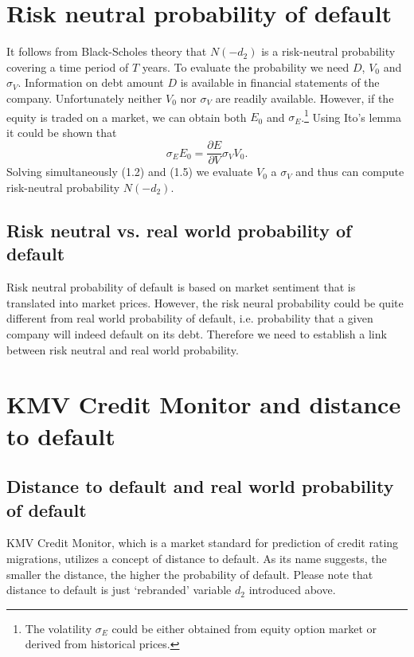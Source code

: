 \documentclass[a4paper]{book}
\begin{document}
\section{Risk neutral probability of default}

It follows from Black-Scholes theory that $N(-d_2)$ is a risk-neutral probability covering a time period of $T$ years. To evaluate the probability we need $D$, $V_0$ and $\sigma_V$. Information on debt amount $D$ is available in financial statements of the company. Unfortunately neither $V_0$ nor $\sigma_V$ are readily available. However, if the equity is traded on a market, we can obtain both $E_0$ and $\sigma_E$.\footnote{The volatility $\sigma_E$ could be either obtained from equity option market or derived from historical prices.} Using Ito's lemma it could be shown that
\begin{equation}
\sigma_E E_0 = \frac{\partial E}{\partial V}\sigma_V V_0.
\end{equation}
Solving simultaneously (1.2) and (1.5) we evaluate $V_0$ a $\sigma_V$ and thus can compute risk-neutral probability $N(-d_2)$.

\subsection{Risk neutral vs. real world probability of default}

Risk neutral probability of default is based on market sentiment that is translated into market prices. However, the risk neural probability could be quite different from real world probability of default, i.e. probability that a given company will indeed default on its debt. Therefore we need to establish a link between risk neutral and real world probability.

\section{KMV Credit Monitor and distance to default}

\subsection{Distance to default and real world probability of default}

KMV Credit Monitor, which is a market standard for prediction of credit rating migrations, utilizes a concept of distance to default. As its name suggests, the smaller the distance, the higher the probability of default. Please note that distance to default is just `rebranded' variable $d_2$ introduced above.
\end{document}
